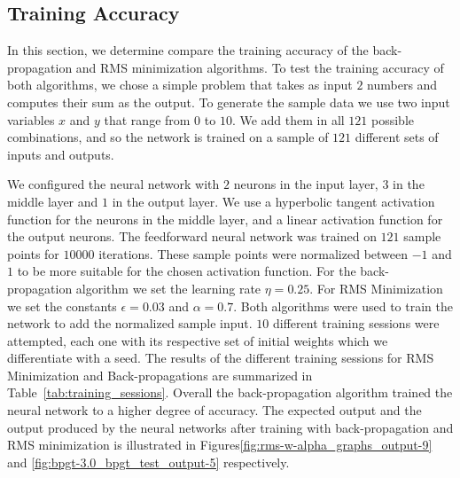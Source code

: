 \documentclass[11pt]{article}
\begin{document}
\subsection{Training Accuracy} %
\label{sub:training_accuracy}

In this section, we determine compare the training accuracy of the back-propagation and RMS minimization algorithms. To test the
training accuracy of both algorithms, we chose a simple problem that takes as input $2$ numbers and computes their sum as the output. To
generate the sample data we use two input variables $x$ and $y$ that range from $0$ to $10$. We add them in all $121$ possible
combinations, and so the network is trained on a sample of $121$ different sets of inputs and outputs.

We configured the neural network with $2$ neurons in the input layer, $3$ in the middle layer and $1$ in the output layer. We use a
hyperbolic tangent activation function for the neurons in the middle layer, and a linear activation function for the output neurons. The
feedforward neural network was trained on $121$ sample points for $10000$ iterations. These sample points were normalized between $-1$
and $1$ to be more suitable for the chosen activation function. For the back-propagation algorithm we set the learning rate $\eta=0.25$.
For RMS Minimization we set the constants $\epsilon=0.03$ and $\alpha=0.7$. Both algorithms were used to train the network to add the
normalized sample input. $10$ different training sessions were attempted, each one with its respective set of initial weights which we
differentiate with a seed. The results of the different training sessions for RMS Minimization and Back-propagations are summarized in
Table~\ref{tab:training_sessions}. Overall the back-propagation algorithm trained the neural network to a higher degree of accuracy. The
expected output and the output produced by the neural networks after training with back-propagation and RMS minimization is illustrated
in Figures\ref{fig:rms-w-alpha_graphs_output-9} and \ref{fig:bpgt-3.0_bpgt_test_output-5} respectively.
\end{document}

